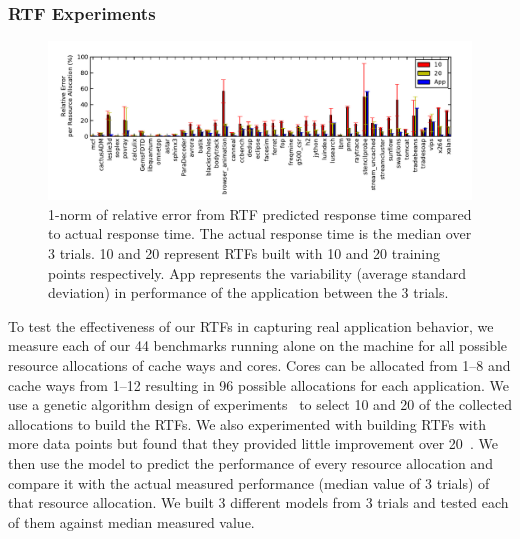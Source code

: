 

\subsubsection{RTF Experiments}
\begin{figure}[!t]
	\begin{center}	
		\includegraphics[bb=0 0 576 216,width=\textwidth]{Figures/model_accuracy.pdf}
		\caption{1-norm of relative error from RTF predicted response time compared to actual response time.  The actual response time is the median over 3 trials. 10 and 20 represent RTFs built with 10 and 20 training points respectively.  App represents the variability (average standard deviation) in performance of the application between the 3 trials.}
		\label{model_accuracy}
	\end{center}
\end{figure}
To test the effectiveness of our RTFs in capturing real application behavior, we measure each of our 44 benchmarks running alone on the machine for all possible resource allocations of cache ways and cores.  Cores can be allocated from 1--8 and cache ways from 1--12 resulting in 96 possible allocations for each application.   We use a genetic algorithm design of experiments~\cite{bates-aes03} to select 10 and 20 of the collected allocations to build the RTFs.  We also experimented with building RTFs with more data points but found that they provided little improvement over 20~\cite{pacora_tr}.  We then use the model to predict the performance of every resource allocation and compare it with the actual measured performance (median value of 3 trials) of that resource allocation.  We built 3 different models from 3 trials and tested each of them against median measured value.

